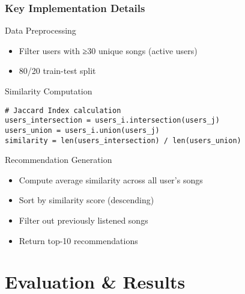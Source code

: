 \documentclass[11pt]{beamer}
\begin{document}
\begin{frame}[fragile]
\frametitle{Key Implementation Details}
\begin{block}{Data Preprocessing}
\begin{itemize}
\item Filter users with ≥30 unique songs (active users)
\item 80/20 train-test split
\end{itemize}
\end{block}

\begin{block}{Similarity Computation}
\small
\begin{verbatim}
# Jaccard Index calculation
users_intersection = users_i.intersection(users_j)
users_union = users_i.union(users_j)
similarity = len(users_intersection) / len(users_union)
\end{verbatim}
\end{block}

\begin{block}{Recommendation Generation}
\begin{itemize}
\item Compute average similarity across all user's songs
\item Sort by similarity score (descending)
\item Filter out previously listened songs
\item Return top-10 recommendations
\end{itemize}
\end{block}
\end{frame}

\section{Evaluation \& Results}
\end{document}
